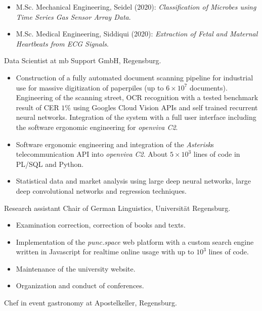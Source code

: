 \documentclass[a4paper, 11pt]{article}
\newcommand{\years}[1]{\marginnote{\scriptsize #1}}
\begin{document}
\begin{itemize}
\begin{itemize}[noitemsep, leftmargin=*]
\begin{itemize}
						\item M.Sc. Mechanical Engineering, Seidel (2020): \emph{Classification of
							Microbes using Time Series Gas Sensor Array Data}.

						\item M.Sc. Medical Engineering, Siddiqui (2020): \emph{Extraction of
							Fetal and Maternal Heartbeats from ECG Signals}.
					\end{itemize}
			\end{itemize}
	\end{itemize}
	\years{2015--18} Data Scientist at mb Support GmbH, Regensburg.
	\begin{itemize}
		\item Construction of a fully automated document scanning pipeline for industrial use for massive digitization of paperpiles (up to $6 \times 10^7$ documents). Engineering of the scanning street, OCR recognition with a tested benchmark result of CER $1\%$ using Googles Cloud Vision APIs and self trained recurrent neural networks. Integration of the system with a full user interface including the software ergonomic engineering for \emph{openviva C2}.

		\item Software ergonomic engineering and integration of the \emph{Asterisk}s telecommunication API into \emph{openviva C2}. About $5 \times 10^3$ lines of code in PL/SQL and Python.

		\item Statistical data and market analysis using large deep neural networks, large deep convolutional networks and regression techniques.
	\end{itemize}
	\years{2013--15} Research assistant Chair of German Linguistics, Universität
	Regensburg.
	\begin{itemize}
		\item Examination correction, correction of books and texts.

		\item Implementation of the \emph{punc.space} web platform with a custom search engine written in Javascript for realtime online usage with up to $10^3$ lines of code.

		\item Maintenance of the university website.

		\item Organization and conduct of conferences.
	\end{itemize}
	\years{2012--15} Chef in event gastronomy at Apostelkeller, Regensburg.
\end{document}
